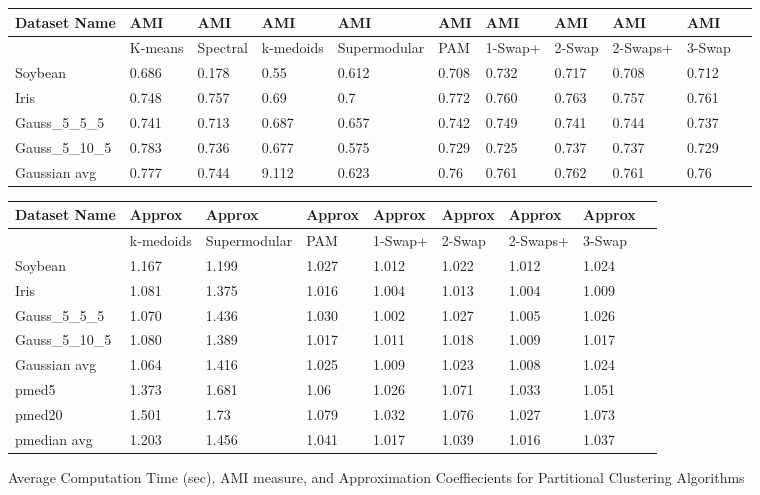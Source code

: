 \documentclass{article}
\begin{document}
\begin{figure*}[h]
\begin{tabular}{ | l | l | l | l | l | l | l | l | l | l | l | }
\hline
	Dataset Name & AMI & AMI & AMI & AMI & AMI & AMI & AMI & AMI & AMI  \\ \hline
	& K-means & Spectral & k-medoids & Supermodular & PAM & 1-Swap+ & 2-Swap & 2-Swaps+ & 3-Swap   \\ \hline
	Soybean & 0.686 & 0.178 & 0.55 & 0.612 & 0.708 & 0.732 & 0.717 & 0.708 & 0.712 \\ 
	Iris & 0.748 & 0.757 & 0.69 & 0.7 & 0.772 & 0.760 & 0.763 & 0.757 & 0.761 \\ 
	Gauss\_5\_5\_5 & 0.741 & 0.713 & 0.687 & 0.657 & 0.742 & 0.749 & 0.741 & 0.744 & 0.737  \\ 
	Gauss\_5\_10\_5 & 0.783 & 0.736 & 0.677 & 0.575 & 0.729 & 0.725 & 0.737 & 0.737& 0.729  \\ 
	Gaussian avg & 0.777 & 0.744 & 9.112 & 0.623 & 0.76 & 0.761 & 0.762 & 0.761 & 0.76 \\ \hline
\end{tabular}
\vspace{0.2 cm}

\begin{tabular}{ | l | l | l | l | l | l | l | l | l | }
\hline
	Dataset Name & Approx & Approx & Approx & Approx & Approx & Approx & Approx  \\ \hline
	& k-medoids & Supermodular & PAM & 1-Swap+ & 2-Swap & 2-Swaps+ & 3-Swap   \\ \hline
	Soybean & 1.167 & 1.199 & 1.027 & 1.012 & 1.022 & 1.012 & 1.024 \\ 
	Iris & 1.081 & 1.375 & 1.016 & 1.004 & 1.013 & 1.004 & 1.009 \\ 
	Gauss\_5\_5\_5 & 1.070 & 1.436 & 1.030 & 1.002 & 1.027 & 1.005 & 1.026  \\ 
	Gauss\_5\_10\_5 & 1.080 & 1.389 & 1.017 & 1.011 & 1.018 & 1.009 & 1.017  \\ 
	Gaussian avg & 1.064 & 1.416 & 1.025 & 1.009 & 1.023 & 1.008 & 1.024 \\ 
	pmed5 & 1.373 & 1.681 & 1.06 & 1.026 & 1.071 & 1.033 & 1.051 \\ 
	pmed20 & 1.501 & 1.73 & 1.079 & 1.032 & 1.076 & 1.027 & 1.073 \\ 
	pmedian avg & 1.203 & 1.456 & 1.041 & 1.017 & 1.039 & 1.016 & 1.037 \\ \hline
\end{tabular}


\caption{Average Computation Time (sec), AMI measure, and Approximation Coeffiecients for Partitional Clustering Algorithms}
\end{figure*}
\end{document}
